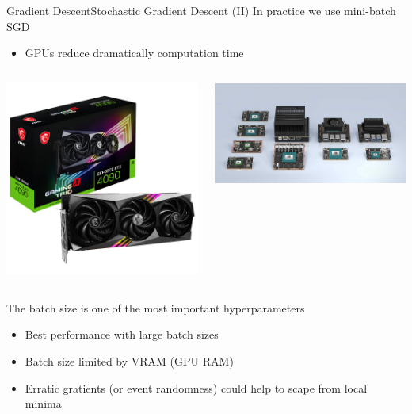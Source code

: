 \documentclass[10pt,compress]{beamer} %
\begin{document}
\begin{frame}{Gradient Descent}{Stochastic Gradient Descent (II)}
    In practice we use mini-batch SGD
    \begin{itemize}
	 \item GPUs reduce dramatically computation time
    \end{itemize}

    \begin{columns}
	\includegraphics[width=\linewidth]{figs/4090.jpg}

	\includegraphics[width=\linewidth]{figs/jetson.jpg}
   \end{columns}

    The batch size is one of the most important hyperparameters 
    \begin{itemize}
	\item Best performance with large batch sizes
    \item Batch size limited by VRAM (GPU RAM)
	\item Erratic gratients (or event randomness) could help to scape from local minima
    \end{itemize}
\end{frame}
\end{document}
